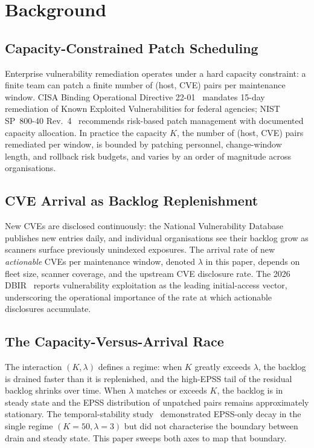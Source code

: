 \section{Background}

\subsection{Capacity-Constrained Patch Scheduling}

Enterprise vulnerability remediation operates under a hard capacity
constraint: a finite team can patch a finite number of (host, CVE) pairs
per maintenance window. CISA Binding Operational Directive 22-01~\cite{cisa2021bod2201}
mandates 15-day remediation of Known Exploited Vulnerabilities for federal
agencies; NIST SP~800-40 Rev.~4~\cite{nist2022sp80040r4} recommends risk-based
patch management with documented capacity allocation. In practice the
capacity $K$, the number of (host, CVE) pairs remediated per window, 
is bounded by patching personnel, change-window length, and rollback risk
budgets, and varies by an order of magnitude across organisations.

\subsection{CVE Arrival as Backlog Replenishment}

New CVEs are disclosed continuously: the National Vulnerability Database
publishes new entries daily, and individual organisations see their backlog
grow as scanners surface previously unindexed exposures. The arrival rate
of new \textit{actionable} CVEs per maintenance window, denoted $\lambda$
in this paper, depends on fleet size, scanner coverage, and the upstream
CVE disclosure rate. The 2026 DBIR~\cite{verizon2026dbir} reports vulnerability
exploitation as the leading initial-access vector, underscoring the
operational importance of the rate at which actionable disclosures
accumulate.

\subsection{The Capacity-Versus-Arrival Race}

The interaction $(K, \lambda)$ defines a regime: when $K$ greatly exceeds
$\lambda$, the backlog is drained faster than it is replenished, and the
high-EPSS tail of the residual backlog shrinks over time. When $\lambda$
matches or exceeds $K$, the backlog is in steady state and the EPSS
distribution of unpatched pairs remains approximately stationary. The temporal-stability study~\cite{paper5temporal}
demonstrated EPSS-only decay in the single regime $(K=50, \lambda=3)$ but
did not characterise the boundary between drain and steady state. This
paper sweeps both axes to map that boundary.

